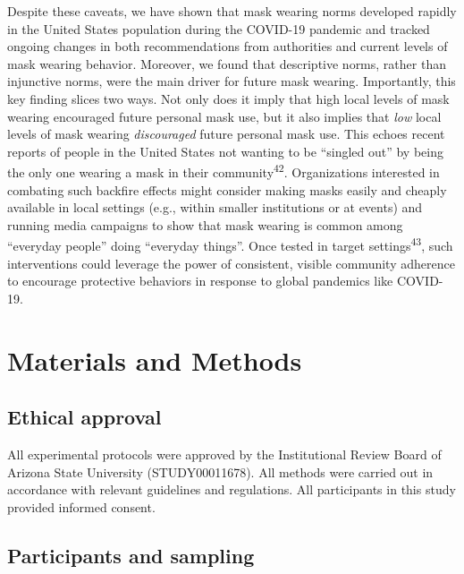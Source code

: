 \documentclass[
  man, donotrepeattitle,floatsintext]{apa6}
\begin{document}
Despite these caveats, we have shown that mask wearing norms developed rapidly in the United States population during the COVID-19 pandemic and tracked ongoing changes in both recommendations from authorities and current levels of mask wearing behavior. Moreover, we found that descriptive norms, rather than injunctive norms, were the main driver for future mask wearing. Importantly, this key finding slices two ways. Not only does it imply that high local levels of mask wearing encouraged future personal mask use, but it also implies that \emph{low} local levels of mask wearing \emph{discouraged} future personal mask use. This echoes recent reports of people in the United States not wanting to be ``singled out'' by being the only one wearing a mask in their community\textsuperscript{42}. Organizations interested in combating such backfire effects might consider making masks easily and cheaply available in local settings (e.g., within smaller institutions or at events) and running media campaigns to show that mask wearing is common among ``everyday people'' doing ``everyday things''. Once tested in target settings\textsuperscript{43}, such interventions could leverage the power of consistent, visible community adherence to encourage protective behaviors in response to global pandemics like COVID-19.

\hypertarget{materials-and-methods}{%
\section{Materials and Methods}\label{materials-and-methods}}

\hypertarget{ethical-approval}{%
\subsection{Ethical approval}\label{ethical-approval}}

All experimental protocols were approved by the Institutional Review Board of Arizona State University (STUDY00011678). All methods were carried out in accordance with relevant guidelines and regulations. All participants in this study provided informed consent.

\hypertarget{participants-and-sampling}{%
\subsection{Participants and sampling}\label{participants-and-sampling}}
\end{document}
